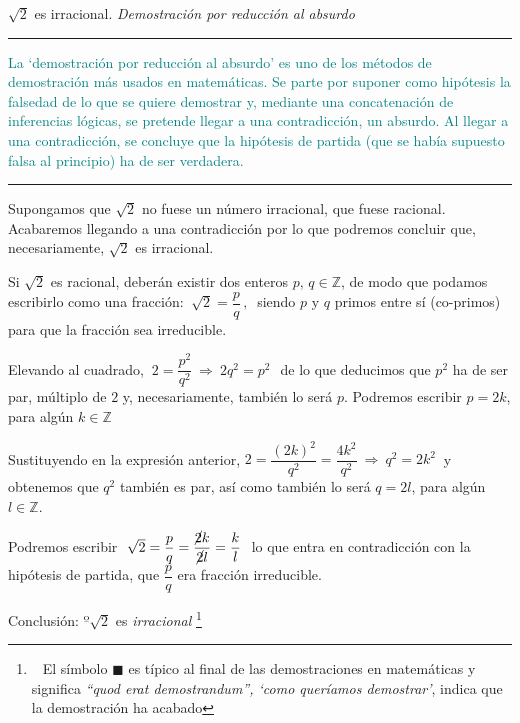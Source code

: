 \vspace{5mm}

\begin{myexampleblock}{ $\sqrt{2}$ es irracional.\hspace{5mm} \emph{Demostración por reducción al absurdo}}


\color{teal}\rule{250pt}{0.1pt}

\begin{footnotesize}{\textcolor{teal}{La `demostración por reducción al absurdo' es uno de los métodos de demostración más usados en matemáticas. Se parte por suponer como hipótesis la falsedad de lo que se quiere demostrar y, mediante una concatenación de inferencias lógicas, se pretende llegar a una contradicción, un absurdo. Al llegar a una contradicción, se concluye que la hipótesis de partida (que se había supuesto falsa al principio) ha de ser verdadera.}}\end{footnotesize}
\vspace{-5mm}
\begin{flushright}
\color{teal}\rule{250pt}{0.1pt}	
\end{flushright}
 
\color{black}

\normalsize{Supongamos} que $\sqrt{2}$ no fuese un número irracional, que fuese racional. Acabaremos llegando a una contradicción por lo que podremos concluir que, necesariamente, $\sqrt{2}$ es irracional.

\vspace{2mm} Si $\sqrt{2}$ es racional, deberán existir dos enteros $p,\, q \in \mathbb Z$, de modo que podamos escribirlo como una fracción:
$\ \sqrt 2=\dfrac p q\, , \ $ siendo $p \text{ y } q$ primos entre sí (co-primos) para que la fracción sea irreducible.

\vspace{2mm} Elevando al cuadrado, $\ 2=\dfrac {p^2}{q^2} \ \Rightarrow \ 2q^2=p^2\, \ $ de lo que deducimos que $p^2$ ha de ser par, múltiplo de $2$ y, necesariamente, también lo será $p$. Podremos escribir $p=2k$, para algún $k\in \mathbb Z$

\vspace{2mm} Sustituyendo en la expresión anterior, $ 2=\dfrac{(2k)^2}{q^2}=\dfrac{4k^2}{q^2} \ \Rightarrow \  q^2=2k^2\ $ y obtenemos que $q^2$ también es par, así como también lo será $q=2l$, para algún $l \in \mathbb Z$.

\vspace{2mm} Podremos escribir $\ \sqrt{2}=\dfrac p q = \dfrac{\cancel{2} k}{\cancel{2} l}=\dfrac k l \ $ lo que entra en contradicción con la hipótesis de partida, que $\dfrac p q$ era fracción irreducible.

\vspace{2mm} Conclusión: $º \sqrt{2}$ es \emph{irracional} \footnote{ $\ \ $ El símbolo $\blacksquare$  es típico al final de las demostraciones en matemáticas y significa \emph{``quod erat demostrandum'', `como queríamos demostrar'}, indica que la demostración ha acabado} \QED
 
\vspace{5mm}
	
\end{myexampleblock}

